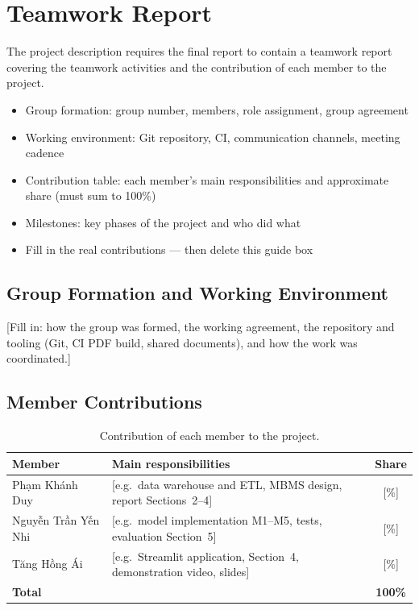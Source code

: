 \appendix
\section{Teamwork Report}

\begin{guide}
  The project description requires the final report to contain a teamwork report covering
  the teamwork activities and the contribution of each member to the project.
  \begin{itemize}
    \item Group formation: group number, members, role assignment, group agreement
    \item Working environment: Git repository, CI, communication channels, meeting cadence
    \item Contribution table: each member's main responsibilities and approximate share (must sum to 100\%)
    \item Milestones: key phases of the project and who did what
    \item Fill in the real contributions --- then delete this guide box
  \end{itemize}
\end{guide}

\subsection{Group Formation and Working Environment}

[Fill in: how the group was formed, the working agreement, the repository and
tooling (Git, CI PDF build, shared documents), and how the work was coordinated.]

\subsection{Member Contributions}

\begin{table}[H]
\centering
\caption{Contribution of each member to the project.}
\label{tab:contributions}
\begin{tabularx}{\textwidth}{@{}l X c@{}}
\toprule
\textbf{Member} & \textbf{Main responsibilities} & \textbf{Share} \\
\midrule
Phạm Khánh Duy & [e.g.\ data warehouse and ETL, MBMS design, report Sections~2--4] & [\%] \\
Nguyễn Trần Yến Nhi & [e.g.\ model implementation M1--M5, tests, evaluation Section~5] & [\%] \\
Tăng Hồng Ái & [e.g.\ Streamlit application, Section~4, demonstration video, slides] & [\%] \\
\midrule
\textbf{Total} & & \textbf{100\%} \\
\bottomrule
\end{tabularx}
\end{table}

